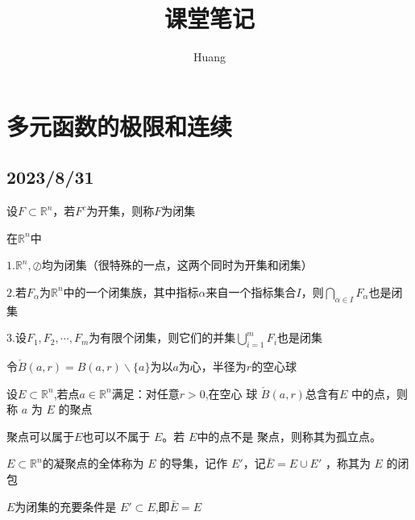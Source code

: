 \documentclass[lang=cn,10pt]{elegantbook}
\title{课堂笔记}
\author{ Huang}
\begin{document}
	
	\maketitle
	\frontmatter
	
	\tableofcontents
	
	\mainmatter
\chapter{多元函数的极限和连续}
\section{2023/8/31}
\begin{definition}
	$\text{设}F\subset \mathbb{R} ^n\text{，若}F^c\text{为开集，则称}F\text{为闭集}$
\end{definition}
\begin{theorem}
	在$\mathbb{R} ^n$中
	
	$1.\mathbb{R} ^n,\oslash$均为闭集（很特殊的一点，这两个同时为开集和闭集）
	
	$2.\text{若}{F_{\alpha}}$为$\mathbb{R} ^n$中的一个闭集族，其中指标$\alpha$来自一个指标集合$I$，则$\bigcap_{\alpha \in I}{F_{\alpha}}$也是闭集
	
	$3.$设$F_{1},F_{2},\cdots,F_{m}$为有限个闭集，则它们的并集$\bigcup_{i=1}^m{F_i}$也是闭集
\end{theorem}
令$\check{B}\left( a,r \right) =B\left( a,r \right) \backslash\{a\}\text{为以}a\text{为心，半径为}r\text{的空心球}$
\begin{definition}
	$\text{设}E\subset \mathbb{R} ^n$,若点$a\in \mathbb{R} ^n$满足：对任意$r>0$,在空心
	球 $\check{B}\left( a,r \right)$总含有$ E$ 中的点，则称 $a$ 为 $E$ 的聚点
\end{definition}
\begin{remark}
	聚点可以属于$ E $也可以不属于 $E$。若 $E $中的点不是
	聚点，则称其为孤立点。
\end{remark}
\begin{definition}
	$E\subset \mathbb{R} ^n$的凝聚点的全体称为 $E$ 的导集，记作
	$E′$，记$\bar{E}=E\cup E'$ ，称其为 $E$ 的闭包
\end{definition}
\begin{theorem}
	$E $为闭集的充要条件是 $E'\subset  E$,即$\bar{E}=E$
\end{theorem}
\end{document}
